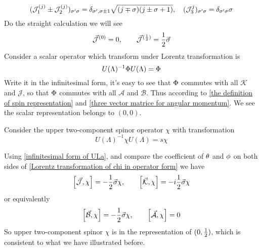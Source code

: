 \begin{equation} \label{three vector matrice for angular momentum}
(\mathcal{J}_1^{(j)}\pm \mathcal{J}_2^{(j)})_{\sigma'\sigma} = \delta_{\sigma',\sigma\pm 1}
\sqrt{(j\mp\sigma)(j\pm\sigma+1)},\quad
(\mathcal{J}_3^{j})_{\sigma'\sigma} = \delta_{\sigma'\sigma} \sigma
\end{equation}
Do the straight calculation we will see
\begin{equation}
  \vec{\mathcal{J}}^{(0)} = 0, \qquad
  \vec{\mathcal{J}}^{(\frac{1}{2})} = \frac{1}{2} \vec{\sigma}
\end{equation}
Consider a scalar operator which transform under Lorentz transformation is
\begin{equation}
  U(\Lambda)^{-1} \Phi U(\Lambda) = \Phi
\end{equation}
Write it in the infinitesimal form, it's easy to see that $\Phi$ commutes with all $\mathcal{K}$ and $\mathcal{J}$, so that  $\Phi$ commutes with all $\mathcal{A}$ and $\mathcal{B}$. Thus according to \eqref{the definition of spin representation} and \eqref{three vector matrice for angular momentum}. We see the scalar representation belongs to $(0,0)$.

Consider the upper two-component spinor operator $\chi$ with transformation
\begin{equation} \label{Lorentz transformation of chi in operator form}
U(\Lambda)^{-1}\chi U(\Lambda) = s \chi
\end{equation}

Using \eqref{infinitesimal form of ULa}, and compare the coefficient of $\theta$ and $\phi$ on both sides of \eqref{Lorentz transformation of chi in operator form} we have
\begin{equation}
  \comm{\vec{\mathcal{J}}}{\chi} = -\half \vec{\s}\chi,\qquad
\comm{\vec{\mathcal{K}}}{\chi} = - i\half \vec{\s}\chi
\end{equation}
or equivalently
\begin{equation}
  \comm{\vec{\mathcal{B}}}{\chi} =- \half \vec{\s}\chi,\qquad
\comm{\vec{\mathcal{A}}}{\chi} =0
\end{equation}
So upper two-component spinor $\chi$ is in the representation of $(0,\frac{1}{2})$, which is consistent to what we have illustrated before.

